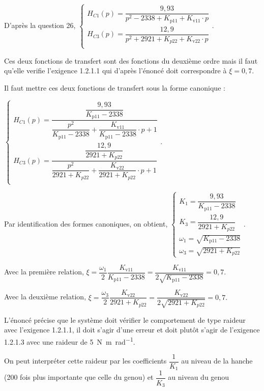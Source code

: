 \ifprof\begin{corrige}

D'après la question 26,
$
\left\{
\begin{array}{l}
H_{C1}(p)=\dfrac{9,93}{p^2-2338+K_{\text{p11}}+K_{\text{v11}}\cdot p}\\
H_{C3}(p)=\dfrac{12,9}{p^2+2921+K_{p22}+K_{\text{v22}}\cdot p}\\
\end{array}
\right.
$.

Ces deux fonctions de transfert sont des fonctions du deuxième ordre mais il faut qu'elle verifie l'exigence 1.2.1.1 qui d'après l'énoncé doit correspondre à $\xi=0,7$.

Il faut mettre ces deux fonctions de transfert sous la forme canonique : 

$\left\{
\begin{array}{l}
H_{C1}(p)=\dfrac{\dfrac{9,93}{K_{\text{p11}}-2338}}{\dfrac{p^2}{K_{\text{p11}}-2338}+\dfrac{K_{\text{v11}}}{K_{\text{p11}}-2338}\cdot p+1}\\
H_{C3}(p)=\dfrac{\dfrac{12,9}{2921+K_{p22}}}{\dfrac{p^2}{2921+K_{p22}}+\dfrac{K_{\text{v22}}}{2921+K_{p22}}\cdot p+1}\\
\end{array}
\right.
$.

Par identification des formes canoniques, on obtient,
$\left\{
\begin{array}{l}
K_1=\dfrac{9,93}{K_{\text{p11}}-2338}\\
K_3=\dfrac{12,9}{2921+K_{p22}}\\
\omega_1=\sqrt{K_{\text{p11}}-2338}\\
\omega_3=\sqrt{2921+K_{p22}}
\end{array}
\right.
$.

Avec la première relation,
$\xi=\dfrac{\omega_1}{2}\dfrac{K_{\text{v11}}}{K_{\text{p11}}-2338}=\dfrac{K_{\text{v11}}}{2\sqrt{K_{\text{p11}}-2338}}=0,7$.

Avec la deuxième relation,
$\xi=\dfrac{\omega_3}{2}\dfrac{K_{\text{v22}}}{2921+K_{p22}}=\dfrac{K_{\text{v22}}}{2\sqrt{2921+K_{p22}}}=0,7.$

L'énoncé précise que le système doit vérifier le comportement de type raideur avec l'exigence 1.2.1.1, il doit s'agir d'une erreur et doit plutôt s'agir de l'exigence 1.2.1.3 avec une raideur de \SI{5}{N.m.rad^{-1}}.

On peut interpréter cette raideur par les coefficients $\dfrac{1}{K_1}$ au niveau de la hanche (200 fois plus importante que celle du genou) et $\dfrac{1}{K_3}$ au niveau du genou


\end{corrige}
